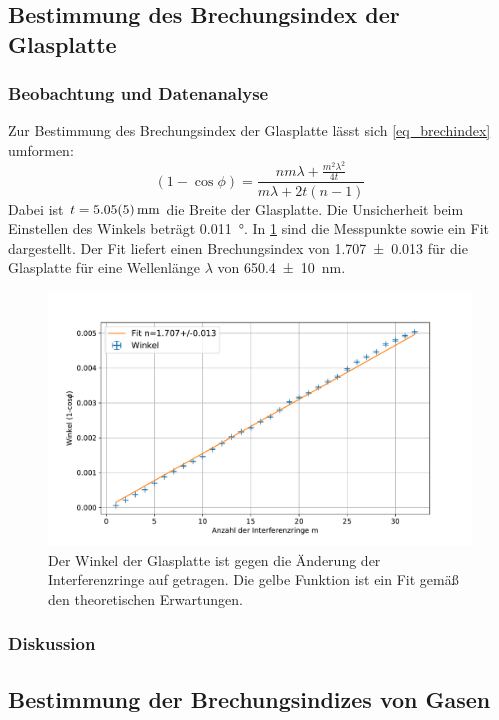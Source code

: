 \documentclass[
	a4paper,
	12pt,
	pagesize,
	ngerman
]{scrartcl}
\begin{document}
	\subsection{Bestimmung des Brechungsindex der Glasplatte}
	\subsubsection{Beobachtung und Datenanalyse}
	Zur Bestimmung des Brechungsindex der Glasplatte lässt sich \cref{eq_brechindex} umformen:
	\begin{equation}
		(1-\cos{\phi}) = \frac{nm\lambda+\frac{m^2\lambda^2}{4t}}{m\lambda+2t(n-1)}
	\end{equation}
	Dabei ist $t= \SI{5.05+-0.05}{mm}$ die Breite der Glasplatte.
	Die Unsicherheit beim Einstellen des Winkels beträgt \SI{0.011}{\degree}.
	In \cref{fig_glas} sind die Messpunkte sowie ein Fit dargestellt.
	Der Fit liefert einen Brechungsindex von \SI{1.707+-0.013}{} für die Glasplatte für eine Wellenlänge $\lambda$ von \SI{650.4+-10}{nm}.

\begin{figure}[H]
		\includegraphics[width=\textwidth]{images/Glas.pdf}
		\centering
		\caption{Der Winkel der Glasplatte ist gegen die Änderung der Interferenzringe auf getragen. Die gelbe Funktion ist ein Fit gemäß den theoretischen Erwartungen.}
		\label{fig_glas}
	\end{figure}

	\subsubsection{Diskussion}

	\subsection{Bestimmung der Brechungsindizes von Gasen}
\end{document}
